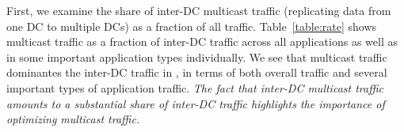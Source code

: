 First, we examine the share of inter-DC multicast traffic
(replicating data from one DC to multiple DCs)
as a fraction of all traffic.
Table~\ref{table:rate} shows multicast traffic as
a fraction of inter-DC traffic across all applications as
well as in some important application types individually.
We see that multicast traffic dominantes the inter-DC traffic
in \company, in terms of both overall traffic and
several important types of application traffic.
{\em The fact that inter-DC multicast traffic
amounts to a substantial share of inter-DC traffic
highlights the importance of optimizing multicast
traffic.}

